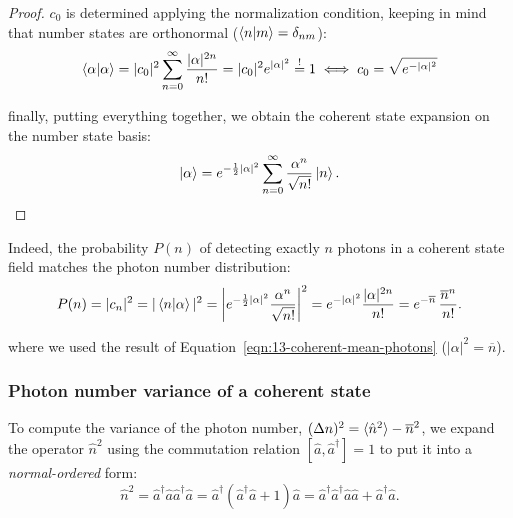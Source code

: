 {\begin{proof}
$c_0$ is determined applying the normalization condition, keeping in mind that number states are orthonormal ($\braket{n|m} = \delta_{nm}$):
\begin{equation}\label{eqn:13-coherent-expansion-normalization}
\braket{\alpha|\alpha} = 
|c_0|^2 \sum_{n=0}^{\infty} \frac{|\alpha|^{2n}}{n!} =
|c_0|^2 e^{|\alpha|^2}
\stackrel{!}{=} 1
\iff
c_0 = \sqrt{e^{-|\alpha|^2}}
\end{equation}

finally, putting everything together, we obtain the coherent state expansion on the number state basis:
\begin{equation}\label{eqn:13-coherent-expansion-final}
\ket{\alpha} = 
e^{-\frac12 |\alpha|^2} 
\sum_{n=0}^{\infty} \frac{\alpha^n}{\sqrt{n!}} \ket{n}.
\end{equation}
\end{proof}
}

Indeed, the probability $P(n)$ of detecting exactly $n$ photons in a coherent state field matches the photon number distribution:
\begin{equation}\label{eqn:13-poisson-distribution}
P(n) = |c_n|^2 = |\braket{n|\alpha}|^2 = 
\left| 
    e^{-\frac{1}{2}|\alpha|^2} \frac{\alpha^n}{\sqrt{n!}}
\right|^2 =
e^{-|\alpha|^2} \frac{|\alpha|^{2n}}{n!} =
e^{-\overline{n}}\, \frac{\overline{n}^n}{n!}.
\end{equation}

where we used the result of Equation~\ref{eqn:13-coherent-mean-photons} ($|\alpha|^2 = \overline{n}$).
 

\subsubsection{Photon number variance of a coherent state}

To compute the variance of the photon number, $(\Delta n)^2 = \braket{\hat{n}^2} - \overline{n}^2$, we expand the operator $\hat{n}^2$ using the commutation relation $[\hat{a}, \hat{a}^\dagger ] = 1$ to put it into a \emph{normal-ordered} form:
\begin{equation}\label{eqn:13-normal-ordering-n2}
\hat{n}^2 = 
\hat{a}^\dagger  \hat{a} \hat{a}^\dagger  \hat{a} = 
\hat{a}^\dagger  
\left( \hat{a}^\dagger  \hat{a} + 1 \right) \hat{a} =
\hat{a}^\dagger  \hat{a}^\dagger \hat{a} \hat{a} + \hat{a}^\dagger \hat{a}.
\end{equation}

